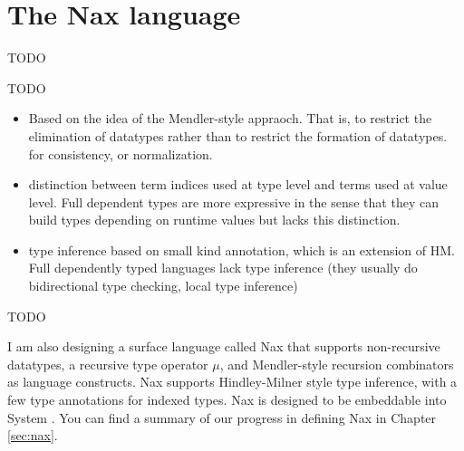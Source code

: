\chapter{The Nax language}\label{ch:nax} TODO

TODO

\begin{itemize}
\item Based on the idea of the Mendler-style appraoch.
That is, to restrict the elimination of datatypes
rather than to restrict the formation of datatypes.
for consistency, or normalization.
\item distinction between term indices used at type level
and terms used at value level. Full dependent types are more
expressive in the sense that they can build types depending on
runtime values but lacks this distinction.
\item type inference based on small kind annotation, which is
an extension of HM. Full dependently typed languages lack
type inference (they usually do bidirectional type checking,
local type inference)
\end{itemize}

TODO

I am also designing a surface language called Nax that supports
non-recursive datatypes, a recursive type operator $\mu$, and
Mendler-style recursion combinators as language constructs.
Nax supports Hindley-Milner style type inference, with a few type annotations
for indexed types. Nax is designed to be embeddable into System \Fi.
You can find a summary of our progress in defining Nax in Chapter \ref{sec:nax}.



